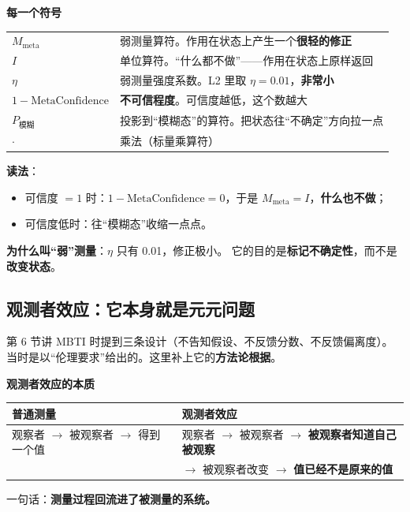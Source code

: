 \documentclass[UTF8,a4paper,11pt]{ctexart}
\newenvironment{explainbox}[1]
{\begin{center}\begin{minipage}{0.94\textwidth}\colorbox{boxbg}{\parbox{0.92\textwidth}{\textbf{#1}\par\vspace{2pt}}}}
{\end{minipage}\end{center}}
\begin{document}
\begin{explainbox}{每一个符号}
\begin{longtable}{@{}p{3.4cm}p{10.4cm}@{}}
$M_{\text{meta}}$ & 弱测量算符。作用在状态上产生一个\textbf{很轻的修正} \\
$I$ & 单位算符。“什么都不做”——作用在状态上原样返回 \\
$\eta$ & 弱测量强度系数。L2 里取 $\eta = 0.01$，\textbf{非常小} \\
$1 - \text{MetaConfidence}$ & \textbf{不可信程度}。可信度越低，这个数越大 \\
$P_{\text{模糊}}$ & 投影到“模糊态”的算符。把状态往“不确定”方向拉一点 \\
$\cdot$ & 乘法（标量乘算符） \\
\end{longtable}
\textbf{读法}：
\begin{itemize}[leftmargin=1.4em,itemsep=1pt]
\item 可信度 $=1$ 时：$1-\text{MetaConfidence}=0$，于是 $M_{\text{meta}}=I$，\textbf{什么也不做}；
\item 可信度低时：往“模糊态”收缩一点点。
\end{itemize}
\textbf{为什么叫“弱”测量}：$\eta$ 只有 0.01，修正极小。
它的目的是\textbf{标记不确定性}，而不是\textbf{改变状态}。
\end{explainbox}

\subsection{观测者效应：它本身就是元元问题}

第 6 节讲 MBTI 时提到三条设计（不告知假设、不反馈分数、不反馈偏离度）。
当时是以“伦理要求”给出的。这里补上它的\textbf{方法论根据}。

\begin{explainbox}{观测者效应的本质}
\begin{center}
\begin{tabular}{p{6.0cm}p{6.4cm}}
\toprule
\textbf{普通测量} & \textbf{观测者效应} \\
\midrule
观察者 $\to$ 被观察者 $\to$ 得到一个值 &
观察者 $\to$ 被观察者 $\to$ \textbf{被观察者知道自己被观察}\\
& $\to$ 被观察者改变 $\to$ \textbf{值已经不是原来的值} \\
\bottomrule
\end{tabular}
\end{center}
一句话：\textbf{测量过程回流进了被测量的系统。}
\end{explainbox}
\end{document}
